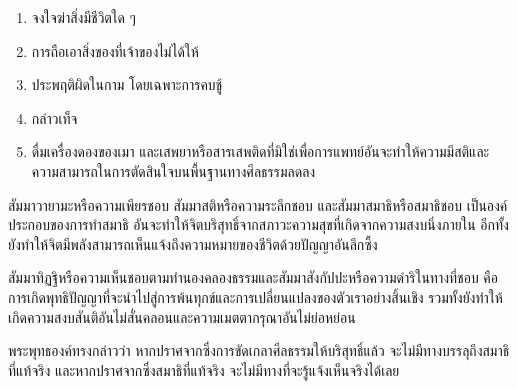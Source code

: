 \documentclass[12pt, openany]{book}
\begin{document}
\begin{enumerate}

\item จงใจ{\wbr}ฆ่า{\wbr}สิ่ง{\wbr}มี{\wbr}ชีวิต{\wbr}ใด ๆ

\item การ{\wbr}ถือ{\wbr}เอา{\wbr}สิ่งของ{\wbr}ที่{\wbr}เจ้าของ{\wbr}ไม่{\wbr}ได้{\wbr}ให้{\wbr}

\item ประพฤติ{\wbr}ผิด{\wbr}ใน{\wbr}กาม โดย{\wbr}เฉพาะ{\wbr}การ{\wbr}คบ{\wbr}ชู้{\wbr}

\item กล่าว{\wbr}เท็จ{\wbr}

\item ดื่ม{\wbr}เครื่อง{\wbr}ดอง{\wbr}ของ{\wbr}เมา และ{\wbr}เสพ{\wbr}ยา{\wbr}หรือ{\wbr}สาร{\wbr}เสพติด{\wbr}ที่{\wbr}มิ{\wbr}ใช่{\wbr}เพื่อ{\wbr}การ{\wbr}แพทย์{\wbr}อัน{\wbr}จะ{\wbr}ทำให้{\wbr}ความ{\wbr}มี{\wbr}สติ{\wbr}และ{\wbr}ความ{\wbr}สามารถ{\wbr}ใน{\wbr}การ{\wbr}ตัดสิน{\wbr}ใจ{\wbr}บน{\wbr}พื้นฐาน{\wbr}ทาง{\wbr}ศีลธรรม{\wbr}ลด{\wbr}ลง{\wbr}

\end{enumerate}

สัมมา{\wbr}วายามะ{\wbr}หรือ{\wbr}ความ{\wbr}เพียร{\wbr}ชอบ สัมมา{\wbr}สติ{\wbr}หรือ{\wbr}ความ{\wbr}ระลึก{\wbr}ชอบ และ{\wbr}สัมมา{\wbr}สมาธิ{\wbr}หรือ{\wbr}สมาธิ{\wbr}ชอบ เป็น{\wbr}องค์{\wbr}ประกอบ{\wbr}ของ{\wbr}การ{\wbr}ทำ{\wbr}สมาธิ อัน{\wbr}จะ{\wbr}ทำให้{\wbr}จิต{\wbr}บริสุทธิ์{\wbr}จาก{\wbr}สภาวะ{\wbr}ความ{\wbr}สุข{\wbr}ที่{\wbr}เกิด{\wbr}จาก{\wbr}ความ{\wbr}สงบ{\wbr}นิ่ง{\wbr}ภายใน อีก{\wbr}ทั้ง ยัง{\wbr}ทำให้{\wbr}จิต{\wbr}มี{\wbr}พลัง{\wbr}สามารถ{\wbr}เห็น{\wbr}แจ้ง{\wbr}ถึง{\wbr}ความหมาย{\wbr}ของ{\wbr}ชีวิต{\wbr}ด้วย{\wbr}ปัญญา{\wbr}อัน{\wbr}ลึกซึ้ง{\wbr}

สัมมา{\wbr}ทิฏฐิ{\wbr}หรือ{\wbr}ความเห็น{\wbr}ชอบ{\wbr}ตาม{\wbr}ทำนอง{\wbr}คลอง{\wbr}ธรรม{\wbr}และ{\wbr}สัมมา{\wbr}สังกัปปะ{\wbr}หรือ{\wbr}ความ{\wbr}ดำริ{\wbr}ใน{\wbr}ทาง{\wbr}ที่{\wbr}ชอบ คือ การ{\wbr}เกิด{\wbr}พุทธิ{\wbr}ปัญญา{\wbr}ที่{\wbr}จะ{\wbr}นำ{\wbr}ไป{\wbr}สู่{\wbr}การ{\wbr}พ้น{\wbr}ทุกข์{\wbr}และ{\wbr}การ{\wbr}เปลี่ยนแปลง{\wbr}ของ{\wbr}ตัว{\wbr}เรา{\wbr}อย่าง{\wbr}สิ้นเชิง  รวม{\wbr}ทั้ง{\wbr}ยัง{\wbr}ทำให้{\wbr}เกิด{\wbr}ความ{\wbr}สงบ{\wbr}สันติ{\wbr}อัน{\wbr}ไม่{\wbr}สั่น{\wbr}คลอน{\wbr}และ{\wbr}ความ{\wbr}เมตตา{\wbr}กรุณา{\wbr}อัน{\wbr}ไม่{\wbr}ย่อหย่อน  

พระพุทธองค์{\wbr}ทรง{\wbr}กล่าว{\wbr}ว่า หาก{\wbr}ปราศจาก{\wbr}ซึ่ง{\wbr}การ{\wbr}ขัด{\wbr}เกลา{\wbr}ศีลธรรม{\wbr}ให้{\wbr}บริสุทธิ์{\wbr}แล้ว จะ{\wbr}ไม่{\wbr}มี{\wbr}ทาง{\wbr}บรรลุ{\wbr}ถึง{\wbr}สมาธิ{\wbr}ที่{\wbr}แท้{\wbr}จริง  และ{\wbr}หาก{\wbr}ปราศจาก{\wbr}ซึ่ง{\wbr}สมาธิ{\wbr}ที่{\wbr}แท้{\wbr}จริง จะ{\wbr}ไม่{\wbr}มี{\wbr}ทาง{\wbr}ที่{\wbr}จะ{\wbr}รู้แจ้ง{\wbr}เห็น{\wbr}จริง{\wbr}ได้{\wbr}เลย  
\end{document}

